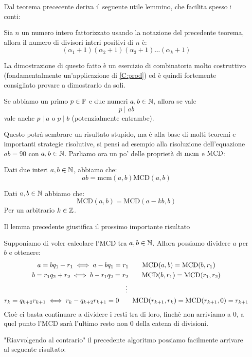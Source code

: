 \documentclass[11pt]{scrartcl}
\begin{document}
	Dal teorema prececente deriva il seguente utile lemmino, che facilita spesso i conti:
	
	\begin{lemma}
		Sia $n$ un numero intero fattorizzato usando la notazione del precedente teorema, allora il numero di divisori interi positivi di $n$ è:
		$$(\alpha_1+1)(\alpha_2+1)(\alpha_3+1)\dots(\alpha_k+1)$$
	\end{lemma}
	
	La dimostrazione di questo fatto è un esercizio di combinatoria molto costruttivo (fondamentalmente un'applicazione di \ref{C:prod}) ed è quindi fortemente consigliato provare a dimostrarlo da soli.
	\begin{lemma}
		Se abbiamo un primo $p\in\mathbb P$ e due numeri $a,b\in\mathbb N$, allora se vale 
		$$p\mid ab$$ 
		vale anche $p\mid a$ o $p \mid b$ (potenzialmente entrambe).
	\end{lemma}
	Questo potrà sembrare un risultato stupido, ma è alla base di molti teoremi e importanti strategie risolutive, si pensi ad esempio alla risoluzione dell'equazione $ab=90$ con $a,b\in\mathbb N$.
	Parliamo ora un po' delle proprietà di $\text{mcm}$ e $\text{MCD}$:
	\begin{lemma}
		Dati due interi $a,b \in \mathbb N$, abbiamo che:
		$$ab=\text{mcm}(a,b)\text{MCD}(a,b)$$
	\end{lemma}
	\begin{lemma}
		Dati $a,b \in \mathbb N$ abbiamo che:
		$$\text{MCD}(a,b)=\text{MCD}(a-kb,b)$$
		Per un arbitrario $k\in \mathbb Z$. 
	\end{lemma}
	Il lemma precedente giustifica il prossimo importante risultato
	\begin{algorithm}[di Euclide]
		Supponiamo di voler calcolare l'MCD tra $a,b \in \mathbb N$. Allora possiamo dividere $a$ per $b$ e ottenere:
		\begin{gather}
			\notag a=bq_1+r_1 \iff a-bq_1=r_1  \qquad \text{MCD}(a,b)=\text{MCD}(b,r_1) \\
			\notag b=r_1q_2+r_2 \iff b-r_1q_2=r_2 \qquad \text{MCD}(b,r_1)=\text{MCD}(r_1,r_2) \\
			\notag \vdots \\
			\notag r_k=q_{k+2}r_{k+1} \iff r_k-q_{k+2}r_{k+1}=0 \qquad \text{MCD}(r_{k+1},r_k)=\text{MCD}(r_{k+1},0)=r_{k+1}
		\end{gather}
		Cioè ci basta continuare a dividere i resti tra di loro, finchè non arriviamo a $0$, a quel punto l'MCD sarà l'ultimo resto non $0$ della catena di divisioni.
	\end{algorithm}
	"Riavvolgendo al contrario" il precedente algoritmo possiamo facilmente arrivare al seguente risultato:
\end{document}
